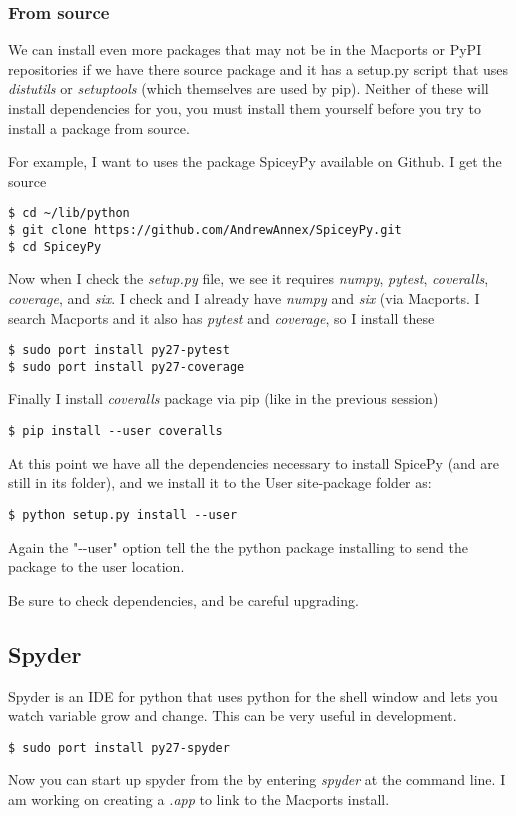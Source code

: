 \documentclass[11pt]{article}
\begin{document}
\subsubsection{From source}
We can install even more packages that may not be in the Macports or PyPI repositories if we have there source package and it has a setup.py script that uses {\it distutils} or {\it setuptools} (which themselves are used by pip). Neither of these will install dependencies for you, you must install them yourself before you try to install a package from source.

For example, I want to uses the package SpiceyPy available on Github. I get the source
\begin{lstlisting}[style=Bash]
$ cd ~/lib/python
$ git clone https://github.com/AndrewAnnex/SpiceyPy.git
$ cd SpiceyPy
\end{lstlisting}
Now when I check the {\it setup.py} file, we see it requires {\it numpy}, {\it pytest}, {\it coveralls}, {\it coverage}, and {\it six}. I check and I already have {\it numpy} and {\it six} (via Macports. I search Macports and it also has {\it pytest} and {\it coverage}, so I install these
\begin{lstlisting}[style=Bash]
$ sudo port install py27-pytest
$ sudo port install py27-coverage
\end{lstlisting}
Finally I install {\it coveralls} package via pip (like in the previous session)
\begin{lstlisting}[style=Bash]
$ pip install --user coveralls
\end{lstlisting}
At this point we have all the dependencies necessary to install SpicePy (and are still in its folder), and we install it to the User site-package folder as:
\begin{lstlisting}[style=Bash]
$ python setup.py install --user
\end{lstlisting}
Again the "-{}-user" option tell the the python package installing to send the package to the user location.

Be sure to check dependencies, and be careful upgrading.


\subsection{Spyder}
Spyder is an IDE for python that uses python for the shell window and lets you watch variable grow and change. This can be very useful in development.
\begin{lstlisting}[style=Bash]
$ sudo port install py27-spyder
\end{lstlisting}
Now you can start up spyder from the by entering {\it spyder} at the command line. I am working on creating a {\it .app} to link to the Macports install.
\end{document}
